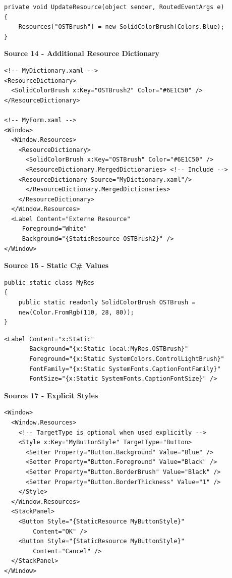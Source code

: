 \documentclass[10pt,twoside,landscape]{article}
\begin{document}
\begin{multicols}{2}
\lstset{language=csharp,label= ,caption= ,captionpos=b,numbers=none}
\begin{lstlisting}
private void UpdateResource(object sender, RoutedEventArgs e)
{
    Resources["OSTBrush"] = new SolidColorBrush(Colors.Blue);
}
\end{lstlisting}

\textbf{Source 14 - Additional Resource Dictionary}
\lstset{language=XML,label= ,caption= ,captionpos=b,numbers=none}
\begin{lstlisting}
<!-- MyDictionary.xaml -->
<ResourceDictionary>
  <SolidColorBrush x:Key="OSTBrush2" Color="#6E1C50" />
</ResourceDictionary>

<!-- MyForm.xaml -->
<Window>
  <Window.Resources>
    <ResourceDictionary>
      <SolidColorBrush x:Key="OSTBrush" Color="#6E1C50" />
      <ResourceDictionary.MergedDictionaries> <!-- Include -->
	<ResourceDictionary Source="MyDictionary.xaml"/>
      </ResourceDictionary.MergedDictionaries>
    </ResourceDictionary>
  </Window.Resources>
  <Label Content="Externe Resource"
	 Foreground="White"
	 Background="{StaticResource OSTBrush2}" />
</Window>
\end{lstlisting}

\textbf{Source 15 - Static C\# Values}
\lstset{language=csharp,label= ,caption= ,captionpos=b,numbers=none}
\begin{lstlisting}
public static class MyRes
{
    public static readonly SolidColorBrush OSTBrush =
	new(Color.FromRgb(110, 28, 80));
}
\end{lstlisting}

\lstset{language=XML,label= ,caption= ,captionpos=b,numbers=none}
\begin{lstlisting}
<Label Content="x:Static"
       Background="{x:Static local:MyRes.OSTBrush}"
       Foreground="{x:Static SystemColors.ControlLightBrush}"
       FontFamily="{x:Static SystemFonts.CaptionFontFamily}"
       FontSize="{x:Static SystemFonts.CaptionFontSize}" />
\end{lstlisting}

\textbf{Source 17 - Explicit Styles}
\lstset{language=XML,label= ,caption= ,captionpos=b,numbers=none}
\begin{lstlisting}
<Window>
  <Window.Resources>
    <!-- TargetType is optional when used explicitly -->
    <Style x:Key="MyButtonStyle" TargetType="Button>
      <Setter Property="Button.Background" Value="Blue" />
      <Setter Property="Button.Foreground" Value="Black" />
      <Setter Property="Button.BorderBrush" Value="Black" />
      <Setter Property="Button.BorderThickness" Value="1" />
    </Style>
  </Window.Resources>
  <StackPanel>
    <Button Style="{StaticResource MyButtonStyle}"
	    Content="OK" />
    <Button Style="{StaticResource MyButtonStyle}"
	    Content="Cancel" />
  </StackPanel>
</Window>
\end{lstlisting}


\end{multicols}
\end{document}
